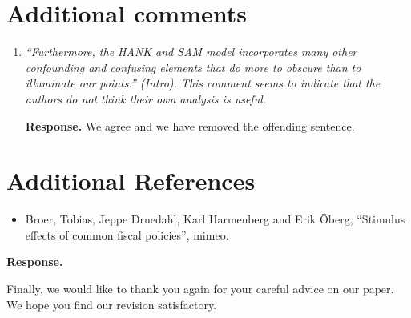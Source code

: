 \documentclass[12pt,letterpaper,english]{article}
\begin{document}
\section*{Additional comments}

	\begin{enumerate}[label=(\alph*)]
		\item \textit{``Furthermore, the HANK and SAM model incorporates many other confounding and confusing elements that do more to obscure than to illuminate our points.'' (Intro). This comment seems to indicate that the authors do not think their own analysis is useful.}
		
		\noindent \textbf{Response.} We agree and we have removed the offending sentence.
	\end{enumerate}

\bigskip

\section*{Additional References}
	
	\begin{itemize}
		\item Broer, Tobias, Jeppe Druedahl, Karl Harmenberg and Erik \"Oberg, ``Stimulus effects of common fiscal policies'', mimeo. 
	\end{itemize}

	\noindent \textbf{Response.} 

\bigskip

\noindent Finally, we would like to thank you again for your careful advice on our paper. We hope you find our revision satisfactory.



\end{document}
